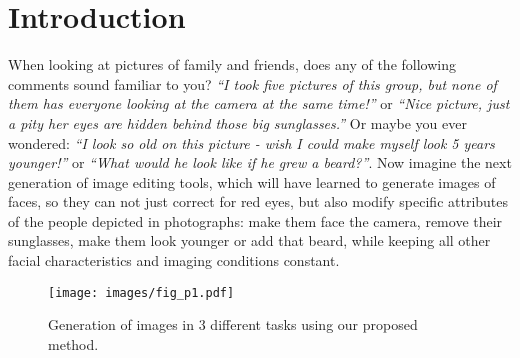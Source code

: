 \documentclass[10pt,twocolumn,letterpaper]{article}
\begin{document}
\section{Introduction}
\label{sec:intro}

When looking at pictures of family and friends, does any of the following comments sound familiar to you? 
{\em``I took five pictures of this group, but none of them has everyone looking at the camera at the same time!''}
or {\em``Nice picture, just a pity her eyes are hidden behind those big sunglasses.''} Or maybe you ever wondered:
{\em``I look so old on this picture - wish I could make myself look 5 years younger!''} or {\em``What would he look like if he grew a beard?''}.
Now imagine the next generation of image editing tools, which will have learned to generate images of faces, so they can not just correct for red eyes, but also modify specific attributes of the people depicted in photographs: make them face the camera, remove their sunglasses, make them look younger or add that beard, while keeping all other facial characteristics
and imaging conditions constant.

\begin{figure}[t]
\centering
\texttt{[image: images/fig\_p1.pdf]} 
\caption{Generation of images in 3 different tasks using our proposed method.}
\label{fig:page1}
\end{figure}
\end{document}
